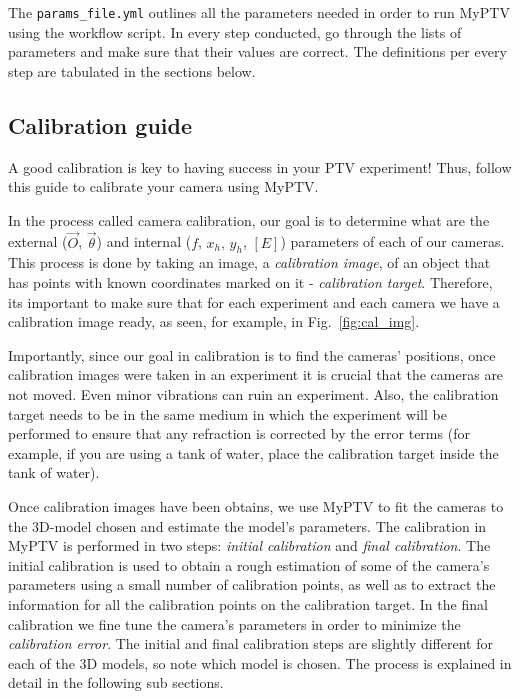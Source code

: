 \documentclass[10pt,a4paper]{article}
\begin{document}
The \texttt{params\_file.yml} outlines all the parameters needed in order to run MyPTV using the workflow script. In every step conducted, go through the lists of parameters and make sure that their values are correct. The definitions per every step are tabulated in the sections below.







\subsection{Calibration guide} \label{sec:cal_guide}


A good calibration is key to having success in your PTV experiment! Thus, follow this guide to calibrate your camera using MyPTV. 


In the process called camera calibration, our goal is to determine what are the external ($\vec{O}$, $\vec{\theta}$) and internal ($f$, $x_h,\,y_h$, $[E]$) parameters of each of our cameras. This process is done by taking an image, a \textit{calibration image}, of an object that has points with known coordinates marked on it - \textit{calibration target}. Therefore, its important to make sure that for each experiment and each camera we have a calibration image ready, as seen, for example, in Fig.~\ref{fig:cal_img}.


Importantly, since our goal in calibration is to find the cameras' positions, once calibration images were taken in an experiment it is crucial that the cameras are not moved. Even minor vibrations can ruin an experiment. Also, the calibration target needs to be in the same medium in which the experiment will be performed to ensure that any refraction is corrected by the error terms (for example, if you are using a tank of water, place the calibration target inside the tank of water). 


Once calibration images have been obtains, we use MyPTV to fit the cameras to the 3D-model chosen and estimate the model's parameters. 
The calibration in MyPTV is performed in two steps: \textit{initial calibration} and \textit{final calibration}. The initial calibration is used to obtain a rough estimation of some of the camera's parameters using a small number of calibration points, as well as to extract the information for all the calibration points on the calibration target. In the final calibration we fine tune the camera's parameters in order to minimize the \textit{calibration error}. 
The initial and final calibration steps are slightly different for each of the 3D models, so note which model is chosen.
The process is explained in detail in the following sub sections. 
\end{document}
